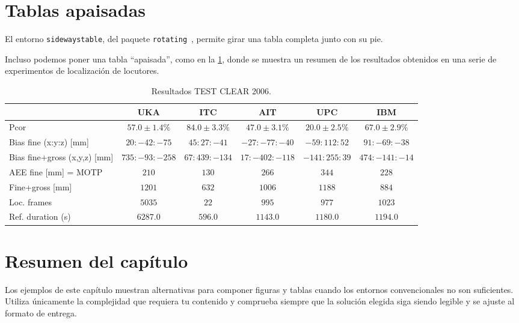



\section{Tablas apaisadas}
\label{sec:tablas-apaisadas}

El entorno \texttt{sidewaystable}, del paquete \texttt{rotating}~\cite{rotating-manual}, permite girar una tabla completa junto con su pie.

Incluso podemos poner una tabla ``apaisada'', como en la \ref{tab:tablas2006}, donde se muestra un resumen de los resultados obtenidos en una serie de experimentos de localización de locutores.

\begin{table}
  \begin{center}
    \begin{tabular}{||l|c|c|c|c|c||}
      \hline \hline
      & UKA & ITC & AIT & UPC & IBM\\
      \hline
      \hline
      Pcor & $57.0\pm1.4\%$ & $84.0\pm3.3\%$ & $47.0\pm3.1\%$ & $20.0\pm2.5\%$ & $67.0\pm2.9\%$ \\
      \hline
      Bias fine (x:y:z) [mm] & $20:-42:-75$ & $45:27:-41$ & $-27:-77:-40$ & $-59:112:52$ & $91:-69:-38$ \\
      \hline
      Bias fine+gross (x,y,z) [mm] & $735:-93:-258$ & $67:439:-134$ & $17:-402:-118$ & $-141:255:39$ & $474:-141:-14$ \\
      \hline
      AEE fine [mm] = MOTP & $210$ & $130$ & $266$ & $344$ & $228$ \\
      \hline
      Fine+gross [mm] & $1201$ & $632$ & $1006$ & $1188$ & $884$ \\
      \hline
      Loc. frames & $5035$ & $22$ & $995$ & $977$ & $1023$ \\
      \hline
      Ref. duration (s) & $6287.0$ & $596.0$ & $1143.0$ & $1180.0$ & $1194.0$ \\
      \hline \hline
    \end{tabular}
    \caption{Resultados TEST CLEAR 2006.}
    \label{tab:tablas2006}
  \end{center}
\end{table}




\section{Resumen del capítulo}
\label{sec:resumen-ejemplos-avanzados}

Los ejemplos de este capítulo muestran alternativas para componer figuras y tablas cuando los entornos convencionales no son suficientes. Utiliza únicamente la complejidad que requiera tu contenido y comprueba siempre que la solución elegida siga siendo legible y se ajuste al formato de entrega.


